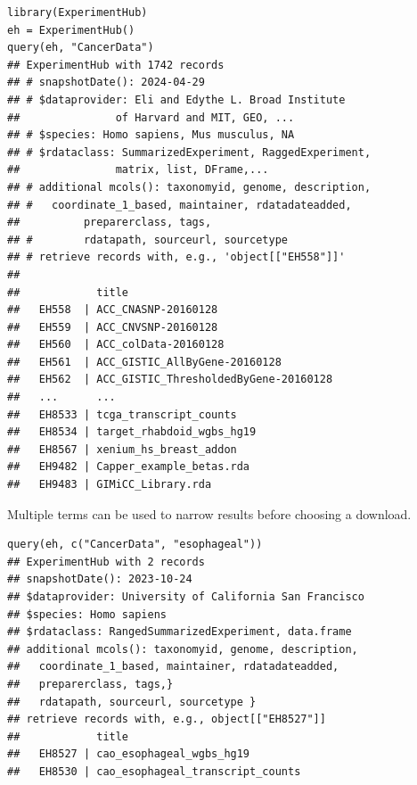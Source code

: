 \documentclass[graybox]{svmult}
\begin{document}
\begin{shaded}
\begin{verbatim}
library(ExperimentHub)
eh = ExperimentHub()
query(eh, "CancerData")
## ExperimentHub with 1742 records
## # snapshotDate(): 2024-04-29
## # $dataprovider: Eli and Edythe L. Broad Institute 
##               of Harvard and MIT, GEO, ...
## # $species: Homo sapiens, Mus musculus, NA
## # $rdataclass: SummarizedExperiment, RaggedExperiment, 
##               matrix, list, DFrame,...
## # additional mcols(): taxonomyid, genome, description,
## #   coordinate_1_based, maintainer, rdatadateadded, 
##          preparerclass, tags,
## #        rdatapath, sourceurl, sourcetype 
## # retrieve records with, e.g., 'object[["EH558"]]' 
## 
##            title                                
##   EH558  | ACC_CNASNP-20160128                  
##   EH559  | ACC_CNVSNP-20160128                  
##   EH560  | ACC_colData-20160128                 
##   EH561  | ACC_GISTIC_AllByGene-20160128        
##   EH562  | ACC_GISTIC_ThresholdedByGene-20160128
##   ...      ...                                  
##   EH8533 | tcga_transcript_counts               
##   EH8534 | target_rhabdoid_wgbs_hg19            
##   EH8567 | xenium_hs_breast_addon               
##   EH9482 | Capper_example_betas.rda             
##   EH9483 | GIMiCC_Library.rda    
\end{verbatim}
\end{shaded}


Multiple terms can be used to narrow results before choosing a download.

\begin{shaded}
\begin{verbatim}
query(eh, c("CancerData", "esophageal"))
## ExperimentHub with 2 records
## snapshotDate(): 2023-10-24
## $dataprovider: University of California San Francisco
## $species: Homo sapiens
## $rdataclass: RangedSummarizedExperiment, data.frame
## additional mcols(): taxonomyid, genome, description,
##   coordinate_1_based, maintainer, rdatadateadded, 
##   preparerclass, tags,}
##   rdatapath, sourceurl, sourcetype }
## retrieve records with, e.g., object[["EH8527"]]
##            title                           
##   EH8527 | cao_esophageal_wgbs_hg19        
##   EH8530 | cao_esophageal_transcript_counts
\end{verbatim}
\end{shaded}
\end{document}
